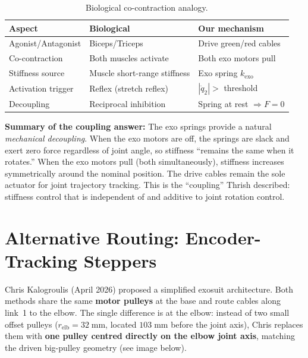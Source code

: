 \documentclass[11pt, a4paper]{article}
\begin{document}
\begin{table}[h]
\centering
\begin{tabular}{@{}lll@{}}
\toprule
\textbf{Aspect} & \textbf{Biological} & \textbf{Our mechanism} \\
\midrule
Agonist/Antagonist  & Biceps/Triceps         & Drive green/red cables \\
Co-contraction      & Both muscles activate  & Both exo motors pull \\
Stiffness source    & Muscle short-range stiffness & Exo spring $k_{\text{exo}}$ \\
Activation trigger  & Reflex (stretch reflex) & $|\ddot{q}_2| > $ threshold \\
Decoupling          & Reciprocal inhibition   & Spring at rest $\Rightarrow F=0$ \\
\bottomrule
\end{tabular}
\caption{Biological co-contraction analogy.}
\label{tab:bio}
\end{table}

\begin{mdframed}
\textbf{Summary of the coupling answer:}
The exo springs provide a natural \emph{mechanical decoupling}.  When the
exo motors are off, the springs are slack and exert zero force regardless of
joint angle, so stiffness ``remains the same when it rotates.''  When the
exo motors pull (both simultaneously), stiffness increases symmetrically
around the nominal position.  The drive cables remain the sole actuator for
joint trajectory tracking.  This is the ``coupling'' Thrish described:
stiffness control that is independent of and additive to joint rotation
control.
\end{mdframed}

\section{Alternative Routing: Encoder-Tracking Steppers}
\label{sec:chris}

Chris Kalogroulis (April 2026) proposed a simplified exosuit architecture.
Both methods share the same \textbf{motor pulleys} at the base and route
cables along link~1 to the elbow.  The single difference is at the elbow:
instead of two small offset pulleys ($r_{\text{elb}} = 32\;\text{mm}$,
located $103\;\text{mm}$ before the joint axis), Chris replaces them with
\textbf{one pulley centred directly on the elbow joint axis}, matching the
driven big-pulley geometry (see image below).
\end{document}
